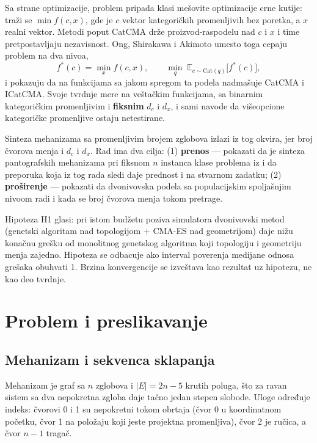 \documentclass[
  conference,
  a4paper,
  10pt]{IEEEtran}
\begin{document}
Sa strane optimizacije, problem pripada klasi mešovite optimizacije crne
kutije: traži se \(\min f(c,x)\), gde je \(c\) vektor kategoričkih
promenljivih bez poretka, a \(x\) realni vektor. Metodi poput CatCMA
\citep{catcma} drže proizvod-raspodelu nad \(c\) i \(x\) i time
pretpostavljaju nezavisnost. Ong, Shirakawa i Akimoto \citep{igbd}
umesto toga cepaju problem na dva nivoa, \[
f^*(c) = \min_x f(c,x), \qquad \min_{q}\; \mathbb{E}_{c \sim \mathrm{Cat}(q)}\big[f^*(c)\big],
\] i pokazuju da na funkcijama sa jakom spregom ta podela nadmašuje
CatCMA i ICatCMA. Svoje tvrdnje mere na veštačkim funkcijama, sa
binarnim kategoričkim promenljivim i \textbf{fiksnim} \(d_c\) i \(d_x\),
i sami navode da višeopcione kategoričke promenljive ostaju netestirane.

Sinteza mehanizama sa promenljivim brojem zglobova izlazi iz tog okvira,
jer broj čvorova menja i \(d_c\) i \(d_x\). Rad ima dva cilja: (1)
\textbf{prenos} --- pokazati da je sinteza pantografskih mehanizama pri
fiksnom \(n\) instanca klase problema iz \citep{igbd} i da preporuka
koja iz tog rada sledi daje prednost i na stvarnom zadatku; (2)
\textbf{proširenje} --- pokazati da dvonivovska podela sa populacijskim
spoljašnjim nivoom radi i kada se broj čvorova menja tokom pretrage.

Hipoteza H1 glasi: pri istom budžetu poziva simulatora dvonivovski metod
(genetski algoritam nad topologijom + CMA-ES nad geometrijom) daje nižu
konačnu grešku od monolitnog genetskog algoritma koji topologiju i
geometriju menja zajedno. Hipoteza se odbacuje ako interval poverenja
medijane odnosa grešaka obuhvati 1. Brzina konvergencije se izveštava
kao rezultat uz hipotezu, ne kao deo tvrdnje.

\hypertarget{problem-i-preslikavanje}{%
\section{Problem i preslikavanje}\label{problem-i-preslikavanje}}

\hypertarget{mehanizam-i-sekvenca-sklapanja}{%
\subsection{Mehanizam i sekvenca
sklapanja}\label{mehanizam-i-sekvenca-sklapanja}}

Mehanizam je graf sa \(n\) zglobova i \(|E| = 2n-5\) krutih poluga, što
za ravan sistem sa dva nepokretna zgloba daje tačno jedan stepen
slobode. Uloge određuje indeks: čvorovi 0 i 1 su nepokretni tokom
obrtaja (čvor 0 u koordinatnom početku, čvor 1 na položaju koji jeste
projektna promenljiva), čvor 2 je ručica, a čvor \(n-1\) tragač.
\end{document}

